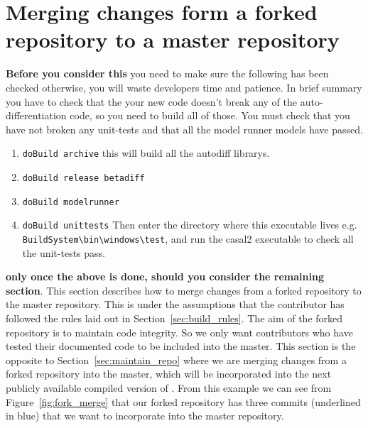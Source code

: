 \section{Merging changes form a forked repository to a master repository\label{sec:pull_requests}}

\textbf{Before you consider this} you need to make sure the following has been checked otherwise, you will waste developers time and patience. In brief summary you have to check that the your new code doesn't break any of the auto-differentiation code, so you need to build all of those. You must check that you have not broken any unit-tests and that all the model runner models have passed.

\begin{enumerate}
\item \texttt{doBuild archive} this will build all the autodiff librarys.
\item \texttt{doBuild release betadiff}
\item \texttt{doBuild modelrunner}
\item \texttt{doBuild unittests} Then enter the directory where this executable lives e.g. \texttt{BuildSystem\textbackslash bin\textbackslash windows\textbackslash test}, and run the casal2 executable to check all the unit-tests pass.
			
\end{enumerate}


\textbf{only once the above is done, should you consider the remaining section}. This section describes how to merge changes from a forked repository to the master repository. This is under the assumptions that the contributor has followed the rules laid out in Section~\ref{sec:build_rules}. The aim of the forked repository is to maintain code integrity. So we only want contributors who have tested their documented code to be included into the master. This section is the opposite to Section~\ref{sec:maintain_repo} where we are merging changes from a forked repository into the master, which will be incorporated into the next publicly available compiled version of \CNAME. From this example we can see from Figure~\ref{fig:fork_merge} that our forked repository has three commits (underlined in blue) that we want to incorporate into the master repository.

